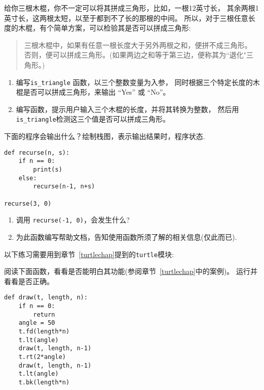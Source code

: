 \documentclass[10pt]{book}
\begin{document}
\begin{exercise}

给你三根木棍，你不一定可以将其拼成三角形，比如，一根12英寸长，
其余两根1英寸长，这两根太短，以至于都到不了长的那根的中间。
所以，对于三根任意长度的木棍，有个简单方案，可以检验其是否可以拼成三角形:

\begin{quotation}
三根木棍中，如果有任意一根长度大于另外两根之和，便拼不成三角形。
否则，便可以拼成三角形。(如果两边之和等于第三边，便称其为``退化"三角形。)
\end{quotation}

\begin{enumerate}

\item 编写\verb"is_triangle" 函数，以三个整数变量为入参，
同时根据三个特定长度的木棍是否可以拼成三角形，来输出 ``Yes'' 或 ``No''。

\item 编写函数，提示用户输入三个木棍的长度，并将其转换为整数，
然后用\verb"is_triangle"检测这三个值是否可以拼成三角形。
\end{enumerate}

\end{exercise}

\begin{exercise}
下面的程序会输出什么？绘制栈图，表示输出结果时，程序状态.

\begin{verbatim}
def recurse(n, s):
    if n == 0:
        print(s)
    else:
        recurse(n-1, n+s)

recurse(3, 0)
\end{verbatim}

\begin{enumerate}

\item 调用 {\tt  recurse(-1, 0)}，会发生什么?

\item 为此函数编写帮助文档，告知使用函数所须了解的相关信息(仅此而已).

\end{enumerate}

\end{exercise}

以下练习需要用到章节~\ref{turtlechap}提到的{\tt turtle}模块:

\begin{exercise}
阅读下面函数，看看是否能明白其功能(参阅章节~\ref{turtlechap}中的案例)。
运行并看看是否正确。

\begin{verbatim}
def draw(t, length, n):
    if n == 0:
        return
    angle = 50
    t.fd(length*n)
    t.lt(angle)
    draw(t, length, n-1)
    t.rt(2*angle)
    draw(t, length, n-1)
    t.lt(angle)
    t.bk(length*n)
\end{verbatim}

\end{exercise}
\end{document}
